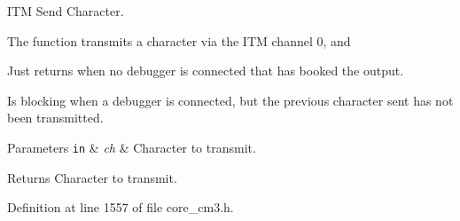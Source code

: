 I\-T\-M Send Character. 

The function transmits a character via the I\-T\-M channel 0, and \begin{DoxyItemize}
\item Just returns when no debugger is connected that has booked the output. \item Is blocking when a debugger is connected, but the previous character sent has not been transmitted.\end{DoxyItemize}

\begin{DoxyParams}[1]{Parameters}
\mbox{\tt in}  & {\em ch} & Character to transmit.\\
\hline
\end{DoxyParams}
\begin{DoxyReturn}{Returns}
Character to transmit. 
\end{DoxyReturn}


Definition at line 1557 of file core\-\_\-cm3.\-h.



